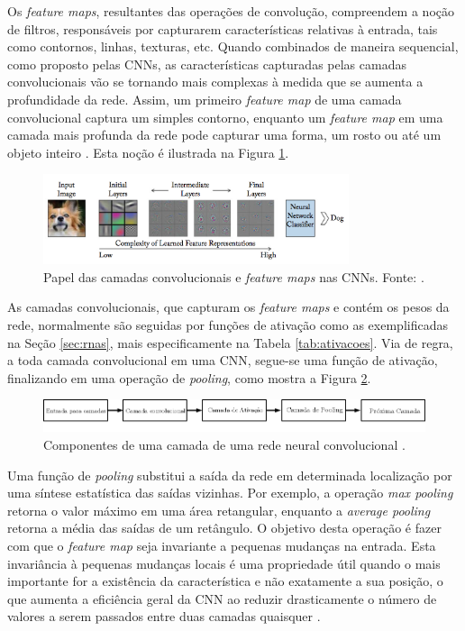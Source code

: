 Os \emph{feature maps}, resultantes das operações de convolução, compreendem a noção de filtros, responsáveis por capturarem características relativas à entrada, tais como contornos, linhas, texturas, etc. Quando combinados de maneira sequencial, como proposto pelas CNNs, as características capturadas pelas camadas convolucionais vão se tornando mais complexas à medida que se aumenta a profundidade da rede. Assim, um primeiro \emph{feature map} de uma camada convolucional captura um simples contorno, enquanto um \emph{feature map} em uma camada mais profunda da rede pode capturar uma forma, um rosto ou até um objeto inteiro \cite{Buduma:Livro}. Esta noção é ilustrada na Figura \ref{fig:convolutions}.

\begin{figure}[!h]
	\centering
	\caption{Papel das camadas convolucionais e \emph{feature maps} nas CNNs. Fonte: \cite{Khan:Livro}.}
	\label{fig:convolutions}
	\includegraphics[width=0.8\textwidth]{./img/fundamenta/convolutions}
\end{figure}

As camadas convolucionais, que capturam os \emph{feature maps} e contém os pesos da rede, normalmente são seguidas por funções de ativação como as exemplificadas na Seção \ref{sec:rnas}, mais especificamente na Tabela \ref{tab:ativacoes}. Via de regra, a toda camada convolucional em uma CNN, segue-se uma função de ativação, finalizando em uma operação de \emph{pooling}, como mostra a Figura \ref{fig:cnn_camada}.

\begin{figure}
	\centering
	\caption{Componentes de uma camada de uma rede neural convolucional \cite{goodfellow2016deep}.}
	\label{fig:cnn_camada}
	\includegraphics[width=\textwidth]{img/cnn_camada_ipe.png}
\end{figure}

 Uma função de \emph{pooling} substitui a saída da rede em determinada localização por uma síntese estatística das saídas vizinhas. Por exemplo, a operação \emph{max pooling} retorna o valor máximo em uma área retangular, enquanto a \emph{average pooling} retorna a média das saídas de um retângulo. O objetivo desta operação é fazer com que o \emph{feature map} seja invariante a pequenas mudanças na entrada. Esta invariância à pequenas mudanças locais é uma propriedade útil quando o mais importante for a existência da característica e não exatamente a sua posição, o que aumenta a eficiência geral da CNN ao reduzir drasticamente o número de valores a serem passados entre duas camadas quaisquer \cite{goodfellow2016deep}.

